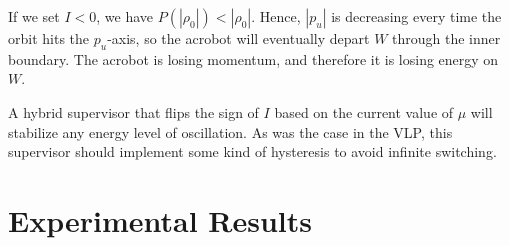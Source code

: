 If we set \(I < 0\), we have \(P(|\rho_0|) < |\rho_0|\).
Hence, \(|p_u|\) is decreasing every time the orbit hits the \(p_u\)-axis, so
the acrobot will eventually depart \(W\) through the inner boundary. 
The acrobot is losing momentum, and therefore it is losing energy on \(W\).

A hybrid supervisor that flips the sign of \(I\) based on the current
value of \(\mu\) will stabilize any energy level of oscillation.
As was the case in the VLP, this supervisor should implement some kind of
hysteresis to avoid infinite switching.


\section{Experimental Results}

